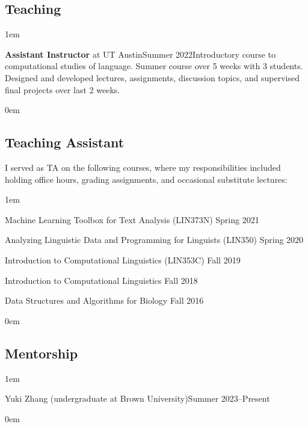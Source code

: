 \subsection{Teaching}
\vspace{-0.5\baselineskip}
\leftskip1em\relax

  {\textbf{Assistant Instructor} at UT Austin}{Summer 2022}{}{Introductory course to computational studies of language. Summer course over 5 weeks with 3 students. Designed and developed lectures, assignments, discussion topics, and supervised final projects over last 2 weeks.}

\leftskip0em\relax
  
\subsection{Teaching Assistant}

\quad I served as TA on the following courses, where my responsibilities included holding office hours, grading assignments, and occasional substitute lectures:

\leftskip1em\relax

\vspace{0.5\baselineskip}

\textbullet\enspace Machine Learning Toolbox for Text Analysis ({\rmsc LIN373N}) \hfill Spring 2021

\textbullet\enspace Analyzing Linguistic Data and Programming for Linguists ({\rmsc LIN350}) \hfill Spring 2020

\textbullet\enspace Introduction to Computational Linguistics ({\rmsc LIN353C}) \hfill Fall 2019

\textbullet\enspace Introduction to Computational Linguistics \hfill Fall 2018

\textbullet\enspace Data Structures and Algorithms for Biology \hfill Fall 2016

\leftskip0em\relax

\subsection{Mentorship}
\vspace{-0.5\baselineskip}
\leftskip1em\relax

  {Yuki Zhang (undergraduate at Brown University)}{Summer 2023--Present}{}{}

\leftskip0em\relax
